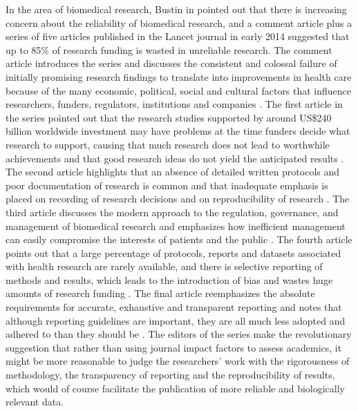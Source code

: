 In the area of biomedical research, Bustin in \cite{bustin2015reproducibility} pointed out that there is increasing concern about the reliability of biomedical research, and a comment article plus a series of five articles published in the Lancet journal in early 2014 suggested that up to 85\% of research funding is wasted in unreliable research. The comment article introduces the series and discusses the consistent and colossal failure of initially promising research findings to translate into improvements in health care because of the many economic, political, social and cultural factors that influence researchers, funders, regulators, institutions and companies \cite{macleod2014biomedical}. The first article in the series pointed out that the research studies supported by around US\$240 billion worldwide investment may have problems at the time funders decide what research to support, causing that much research does not lead to worthwhile achievements and that good research ideas do not yield the anticipated results \cite{chalmers2014increase}. The second article highlights that an absence of detailed written protocols and poor documentation of
research is common and that inadequate emphasis is placed on recording of research decisions and on reproducibility of research \cite{ioannidis2014increasing}. The third article discusses the modern approach to the regulation, governance, and management of biomedical research and emphasizes how inefficient management can easily compromise the interests of patients and the public \cite{salman2014increasing}. The fourth article points out that a large percentage of protocols, reports and datasets associated with health research are rarely available, and there is selective reporting of methods and results, which leads to the introduction of bias and wastes huge amounts of research funding \cite{chan2014increasing}. The final article reemphasizes the absolute requirements for accurate, exhaustive and transparent reporting and notes that although reporting guidelines are important, they are all much less adopted and adhered to than they should be \cite{glasziou2014reducing}. The editors of the series make the revolutionary suggestion that rather than using journal impact factors to assess academics, it might be more reasonable to judge the researchers' work with the rigorousness of methodology, the transparency of reporting and the reproducibility of results, which would of course facilitate the publication of more reliable and biologically relevant data.


